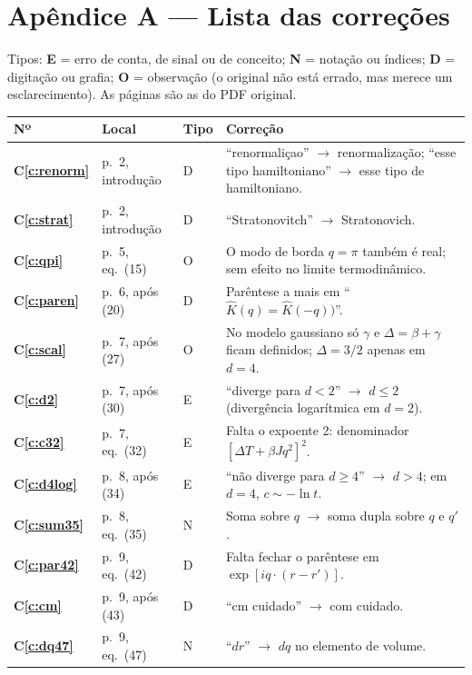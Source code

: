 \documentclass[12pt,a4paper]{article}
\newcommand{\Kh}{\widehat{K}}
\newcounter{corr}
\newcommand{\Cref}[1]{\textbf{C\ref{#1}}}
\begin{document}
\newpage
{\color{red}
\section*{Apêndice A --- Lista das correções}

Tipos: \textbf{E} = erro de conta, de sinal ou de conceito; \textbf{N} = notação ou índices;
\textbf{D} = digitação ou grafia; \textbf{O} = observação (o original não está errado, mas
merece um esclarecimento). As páginas são as do PDF original.

\small
\begin{longtable}{@{}p{0.9cm}p{2.9cm}p{0.6cm}p{10.6cm}@{}}
\toprule
Nº & Local & Tipo & Correção\\
\midrule
\endhead
\bottomrule
\endfoot
\Cref{c:renorm} & p.~2, introdução & D & ``renormaliçao'' $\to$ renormalização; ``esse tipo hamiltoniano'' $\to$ esse tipo de hamiltoniano.\\
\Cref{c:strat} & p.~2, introdução & D & ``Stratonovitch'' $\to$ Stratonovich.\\
\Cref{c:qpi} & p.~5, eq.~(15) & O & O modo de borda $q=\pi$ também é real; sem efeito no limite termodinâmico.\\
\Cref{c:paren} & p.~6, após (20) & D & Parêntese a mais em ``$\Kh(q)=\Kh(-q))$''.\\
\Cref{c:scal} & p.~7, após (27) & O & No modelo gaussiano só $\gamma$ e $\Delta=\beta+\gamma$ ficam definidos; $\Delta=3/2$ apenas em $d=4$.\\
\Cref{c:d2} & p.~7, após (30) & E & ``diverge para $d<2$'' $\to$ $d\leq2$ (divergência logarítmica em $d=2$).\\
\Cref{c:c32} & p.~7, eq.~(32) & E & Falta o expoente 2: denominador $[\Delta T+\beta Jq^2]^2$.\\
\Cref{c:d4log} & p.~8, após (34) & E & ``não diverge para $d\geq4$'' $\to$ $d>4$; em $d=4$, $c\sim-\ln t$.\\
\Cref{c:sum35} & p.~8, eq.~(35) & N & Soma sobre $q$ $\to$ soma dupla sobre $q$ e $q'$.\\
\Cref{c:par42} & p.~9, eq.~(42) & D & Falta fechar o parêntese em $\exp[iq\cdot(r-r')]$.\\
\Cref{c:cm} & p.~9, após (43) & D & ``cm cuidado'' $\to$ com cuidado.\\
\Cref{c:dq47} & p.~9, eq.~(47) & N & ``$dr$'' $\to$ $dq$ no elemento de volume.\\

\end{longtable}}
\end{document}
